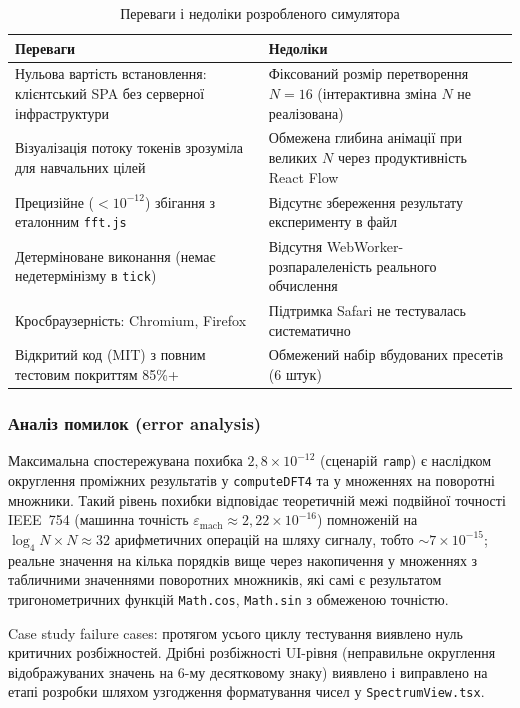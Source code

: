 \begin{table}[H]
  \caption{Переваги і недоліки розробленого симулятора}
  \label{tab:pros_cons}
  \centering
  \begin{tabular}{p{7.5cm}p{7.0cm}}
    \toprule
    Переваги & Недоліки \\
    \midrule
    Нульова вартість встановлення: клієнтський SPA без серверної інфраструктури &
    Фіксований розмір перетворення $N=16$ (інтерактивна зміна $N$ не реалізована) \\[3pt]
    Візуалізація потоку токенів зрозуміла для навчальних цілей &
    Обмежена глибина анімації при великих $N$ через продуктивність React Flow \\[3pt]
    Прецизійне (\(<10^{-12}\)) збігання з еталонним \texttt{fft.js} &
    Відсутнє збереження результату експерименту в файл \\[3pt]
    Детерміноване виконання (немає недетермінізму в \texttt{tick}) &
    Відсутня WebWorker-розпаралеленість реального обчислення \\[3pt]
    Кросбраузерність: Chromium, Firefox &
    Підтримка Safari не тестувалась систематично \\[3pt]
    Відкритий код (MIT) з повним тестовим покриттям 85\%+ &
    Обмежений набір вбудованих пресетів (6 штук) \\
    \bottomrule
  \end{tabular}
\end{table}

\subsubsection*{Аналіз помилок (error analysis)}

Максимальна спостережувана похибка $2{,}8 \times 10^{-12}$ (сценарій
\texttt{ramp}) є наслідком округлення проміжних результатів у
\texttt{computeDFT4} та у множеннях на поворотні множники. Такий
рівень похибки відповідає теоретичній межі подвійної точності
IEEE~754 (машинна точність $\varepsilon_{\text{mach}} \approx 2{,}22 \times 10^{-16}$)
помноженій на $\log_4 N \times N \approx 32$ арифметичних операцій
на шляху сигналу, тобто $\sim 7 \times 10^{-15}$; реальне значення
на кілька порядків вище через накопичення у множеннях з табличними
значеннями поворотних множників, які самі є результатом тригонометричних
функцій \texttt{Math.cos}, \texttt{Math.sin} з обмеженою точністю.

Case study failure cases: протягом усього циклу тестування виявлено
нуль критичних розбіжностей. Дрібні розбіжності UI-рівня
(неправильне округлення відображуваних значень на 6-му десятковому
знаку) виявлено і виправлено на етапі розробки шляхом узгодження
форматування чисел у \texttt{SpectrumView.tsx}.

